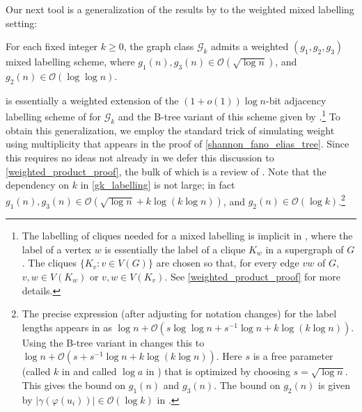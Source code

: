 \documentclass{patmorin}
\renewcommand{\ge}{\geqslant}
\newcommand{\david}[1]{{\color{orange} DW: #1}}
\newcommand{\pat}[1]{\textcolor{Magenta}{PaMo: #1}}
\newcommand{\Oh}{\calO}
\newcommand{\calG}{\mathcal{G}}
\newcommand{\calO}{\mathcal{O}}
\begin{document}

  Our next tool is a generalization of the results by  \citet{dujmovic.esperet.ea:adjacency} to the weighted mixed labelling setting:

  \begin{thm}\label{gk_labelling}
    For each fixed integer $k\ge 0$, the graph class $\calG_{k}$
    admits a weighted $(g_1,g_2,g_3)$ mixed labelling scheme, where $g_1(n),g_3(n)\in \Oh(\sqrt{\log n})$, and $g_2(n)\in \Oh(\log\log n)$.
  \end{thm}


  \label{sketch_start}
   is essentially a weighted extension of the $(1+o(1))\log n$-bit adjacency labelling scheme of \citet{dujmovic.esperet.ea:adjacency} for $\calG_k$ and the B-tree variant of this scheme given by \citet{gawrychowski.janczewski:simpler}.\footnote{The labelling of cliques needed for a mixed labelling is implicit in \cite{dujmovic.esperet.ea:adjacency}, where the label of a vertex $w$ is essentially the label of a clique $K_w$ in a supergraph of $G$. The cliques $\{K_v:v\in V(G)\}$ are chosen so that, for every edge $vw$ of $G$, $v,w\in V(K_w)$ or $v,w\in V(K_v)$. See \cref{weighted_product_proof} for more details.}  To obtain this generalization, we employ the standard trick of simulating weight using multiplicity that appears in the proof of \cref{shannon_fano_elias_tree}.  Since this requires no ideas not already in \cite{gawrychowski.janczewski:simpler,dujmovic.esperet.ea:adjacency} we defer this discussion to \cref{weighted_product_proof}, the bulk of which is a review of \cite{gawrychowski.janczewski:simpler,dujmovic.esperet.ea:adjacency}.  Note that the dependency on $k$ in \cref{gk_labelling} is not large; in fact $g_1(n),g_3(n)\in \Oh(\sqrt{\log n} + k\log(k\log n))$, and $g_2(n)\in\Oh(\log k)$.\footnote{The precise expression (after adjusting for notation changes) for the label lengths appears in  \cite[Section 5.4]{dujmovic.esperet.ea:adjacency} as $\log n + \Oh(s\log \log n + s^{-1}\log n + k\log (k\log n))$.  Using the B-tree variant in \cite{gawrychowski.janczewski:simpler} changes this to $\log n + \Oh(s + s^{-1}\log n + k\log(k\log n))$.  Here $s$ is a free parameter (called $k$ in \cite{dujmovic.esperet.ea:adjacency} and called $\log a$ in \cite{gawrychowski.janczewski:simpler}) that is optimized by choosing $s=\sqrt{\log n}$. This gives the bound on $g_1(n)$ and $g_3(n)$.  The bound on $g_2(n)$ is given by $|\gamma(\varphi(u_i))|\in \Oh(\log k)$ in  \cite[Section 5.4]{dujmovic.esperet.ea:adjacency}.}
\end{document}

